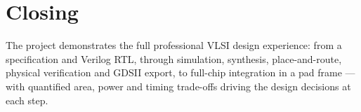 \section{Closing}
The project demonstrates the full professional VLSI design experience:
from a specification and Verilog RTL, through simulation, synthesis,
place-and-route, physical verification and GDSII export, to full-chip
integration in a pad frame --- with quantified area, power and timing
trade-offs driving the design decisions at each step.
